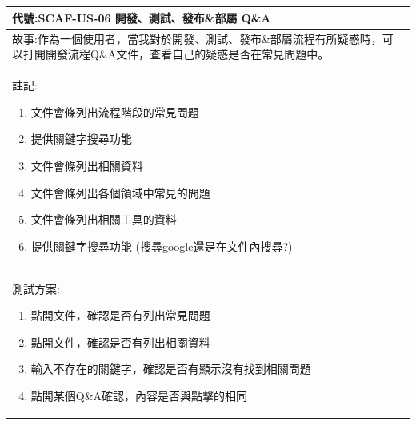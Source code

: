 \documentclass{report}
\begin{document}
\subsection*{}
\fontsize{12}{20}\selectfont
\begin{tabularx}{\textwidth}{|X|}
  \hline
  代號:SCAF-US-06 開發、測試、發布\&部屬 Q\&A \\
  \hline
  故事:作為一個使用者，當我對於開發、測試、發布\&部屬流程有所疑惑時，可以打開開發流程Q\&A文件，查看自己的疑惑是否在常見問題中。 \\
  \hline
  註記:
  \begin{enumerate}
    \item 文件會條列出流程階段的常見問題
    \item 提供關鍵字搜尋功能
    \item 文件會條列出相關資料
    \item 文件會條列出各個領域中常見的問題
    \item 文件會條列出相關工具的資料
    \item 提供關鍵字搜尋功能 (搜尋google還是在文件內搜尋?)
  \end{enumerate} \\
  \hline
  測試方案:
  \begin{enumerate}
    \item 點開文件，確認是否有列出常見問題
    \item 點開文件，確認是否有列出相關資料
    \item 輸入不存在的關鍵字，確認是否有顯示沒有找到相關問題
    \item 點開某個Q\&A確認，內容是否與點擊的相同
  \end{enumerate} \\
  \hline
\end{tabularx}
\end{document}
